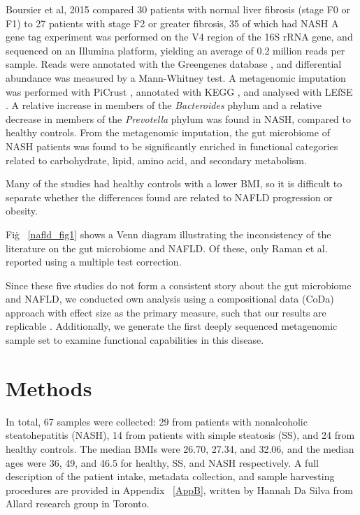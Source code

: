 Boursier et al, 2015 \cite{boursier2016severity} compared 30 patients with normal liver fibrosis (stage F0 or F1) to 27 patients with stage F2 or greater fibrosis, 35 of which had NASH A gene tag experiment was performed on the V4 region of the 16S rRNA gene, and sequenced on an Illumina platform, yielding an average of 0.2 million reads per sample. Reads were annotated with the Greengenes database \cite{desantis2006greengenes}, and differential abundance was measured by a Mann-Whitney test. A metagenomic imputation was performed with PiCrust \cite{langille2013predictive}, annotated with KEGG \cite{kanehisa2000kegg}, and analysed with LEfSE \cite{segata2011metagenomic}. A relative increase in members of the \textit{Bacteroides} phylum and a relative decrease in members of the \textit{Prevotella} phylum was found in NASH, compared to healthy controls. From the metagenomic imputation, the gut microbiome of NASH patients was found to be significantly enriched in functional categories related to carbohydrate, lipid, amino acid, and secondary metabolism.

Many of the studies had healthy controls with a lower BMI, so it is difficult to separate whether the differences found are related to NAFLD progression or obesity.

Fig\. ~\ref{nafld_fig1} shows a Venn diagram illustrating the inconsistency of the literature on the gut microbiome and NAFLD. Of these, only Raman et al. \cite{raman2013fecal} reported using a multiple test correction.

Since these five studies do not form a consistent story about the gut microbiome and NAFLD, we conducted own analysis using a compositional data (CoDa) approach with effect size as the primary measure, such that our results are replicable \cite{halsey2015fickle}. Additionally, we generate the first deeply sequenced metagenomic sample set to examine functional capabilities in this disease.

\FloatBarrier

\section{Methods}
In total, 67 samples were collected: 29 from patients with nonalcoholic steatohepatitis (NASH), 14 from patients with simple steatosis (SS), and 24 from healthy controls. The median BMIs were 26.70, 27.34, and 32.06, and the median ages were 36, 49, and 46.5 for healthy, SS, and NASH respectively. A full description of the patient intake, metadata collection, and sample harvesting procedures are provided in Appendix ~\ref{AppB}, written by Hannah Da Silva from Allard research group in Toronto.


